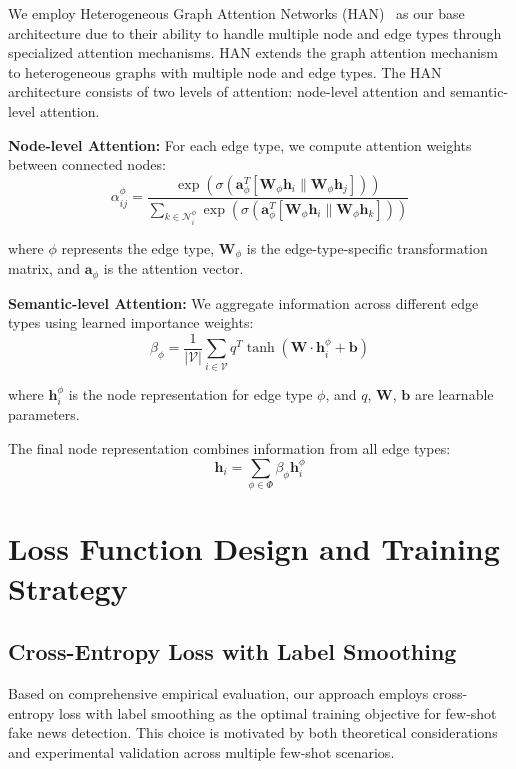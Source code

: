 We employ Heterogeneous Graph Attention Networks (HAN)~\cite{wang2019han} as our base architecture due to their ability to handle multiple node and edge types through specialized attention mechanisms. HAN extends the graph attention mechanism~\cite{veličković2018graph} to heterogeneous graphs with multiple node and edge types. The HAN architecture consists of two levels of attention: node-level attention and semantic-level attention.

\textbf{Node-level Attention:} For each edge type, we compute attention weights between connected nodes:
\begin{equation}
\alpha_{ij}^{\phi} = \frac{\exp(\sigma(\mathbf{a}_{\phi}^T[\mathbf{W}_{\phi}\mathbf{h}_i \| \mathbf{W}_{\phi}\mathbf{h}_j]))}{\sum_{k \in \mathcal{N}_i^{\phi}} \exp(\sigma(\mathbf{a}_{\phi}^T[\mathbf{W}_{\phi}\mathbf{h}_i \| \mathbf{W}_{\phi}\mathbf{h}_k]))}
\end{equation}

where $\phi$ represents the edge type, $\mathbf{W}_{\phi}$ is the edge-type-specific transformation matrix, and $\mathbf{a}_{\phi}$ is the attention vector.

\textbf{Semantic-level Attention:} We aggregate information across different edge types using learned importance weights:
\begin{equation}
\beta_{\phi} = \frac{1}{|\mathcal{V}|} \sum_{i \in \mathcal{V}} q^T \tanh(\mathbf{W} \cdot \mathbf{h}_i^{\phi} + \mathbf{b})
\end{equation}

where $\mathbf{h}_i^{\phi}$ is the node representation for edge type $\phi$, and $q$, $\mathbf{W}$, $\mathbf{b}$ are learnable parameters.

The final node representation combines information from all edge types:
\begin{equation}
\mathbf{h}_i = \sum_{\phi \in \Phi} \beta_{\phi} \mathbf{h}_i^{\phi}
\end{equation}

\section{Loss Function Design and Training Strategy}

\subsection{Cross-Entropy Loss with Label Smoothing}

Based on comprehensive empirical evaluation, our approach employs cross-entropy loss with label smoothing as the optimal training objective for few-shot fake news detection. This choice is motivated by both theoretical considerations and experimental validation across multiple few-shot scenarios.

